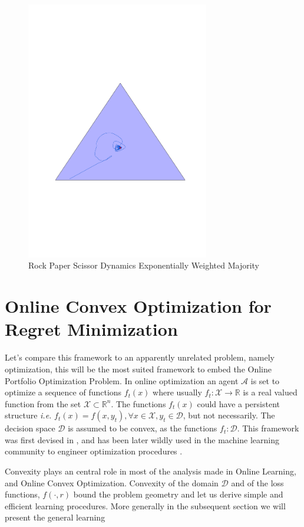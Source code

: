 \begin{figure}[t!]
    \centering
    \includegraphics[width=8cm]{./img/rps_ewm.pdf}
\caption{Rock Paper Scissor Dynamics Exponentially Weighted Majority}
\label{fig:OL}
\end{figure}

\section{Online Convex Optimization for Regret Minimization}\label{sec:OCO}

Let's compare this framework to an apparently unrelated problem, namely optimization, this will be the most suited framework to embed the Online Portfolio Optimization Problem. In online optimization an agent $\mathcal A$ is set to optimize a sequence of functions $f_t(x)$ where usually $f_t:\mathcal X\to \mathbb R$ is a real valued function from the set $\mathcal X\subset\mathbb R^n$. The functions $f_t(x)$ could have a persistent structure \emph{i.e.} $f_t(x)=f(x,y_t),\forall x\in\mathcal X,y_t\in\mathcal D$, but not necessarily.
The decision space $\mathcal D$ is assumed to be convex, as the functions $f_t:\mathcal D$. This framework was first devised in \cite{zinkevich2003online}, and has been later wildly used in the machine learning community to engineer optimization procedures \cite{shalev2012online}. 

Convexity plays an central role in most of the analysis made in Online Learning, and Online Convex Optimization. Convexity of the domain $\mathcal D$ and of the loss functions, $f(\cdot,r)$ bound the problem geometry and let us derive simple and efficient learning procedures. More generally in the subsequent section we will present the general learning 

